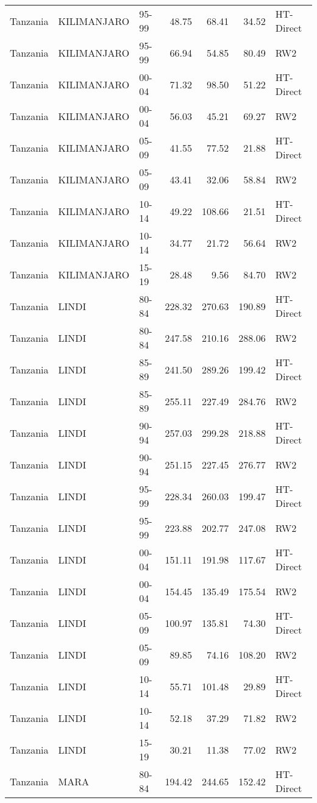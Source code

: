 \begin{longtable}{lllrrrl}
  Tanzania & KILIMANJARO & 95-99 & 48.75 & 68.41 & 34.52 & HT-Direct \\ 
  Tanzania & KILIMANJARO & 95-99 & 66.94 & 54.85 & 80.49 & RW2 \\ 
  Tanzania & KILIMANJARO & 00-04 & 71.32 & 98.50 & 51.22 & HT-Direct \\ 
  Tanzania & KILIMANJARO & 00-04 & 56.03 & 45.21 & 69.27 & RW2 \\ 
  Tanzania & KILIMANJARO & 05-09 & 41.55 & 77.52 & 21.88 & HT-Direct \\ 
  Tanzania & KILIMANJARO & 05-09 & 43.41 & 32.06 & 58.84 & RW2 \\ 
  Tanzania & KILIMANJARO & 10-14 & 49.22 & 108.66 & 21.51 & HT-Direct \\ 
  Tanzania & KILIMANJARO & 10-14 & 34.77 & 21.72 & 56.64 & RW2 \\ 
  Tanzania & KILIMANJARO & 15-19 & 28.48 & 9.56 & 84.70 & RW2 \\ 
  Tanzania & LINDI & 80-84 & 228.32 & 270.63 & 190.89 & HT-Direct \\ 
  Tanzania & LINDI & 80-84 & 247.58 & 210.16 & 288.06 & RW2 \\ 
  Tanzania & LINDI & 85-89 & 241.50 & 289.26 & 199.42 & HT-Direct \\ 
  Tanzania & LINDI & 85-89 & 255.11 & 227.49 & 284.76 & RW2 \\ 
  Tanzania & LINDI & 90-94 & 257.03 & 299.28 & 218.88 & HT-Direct \\ 
  Tanzania & LINDI & 90-94 & 251.15 & 227.45 & 276.77 & RW2 \\ 
  Tanzania & LINDI & 95-99 & 228.34 & 260.03 & 199.47 & HT-Direct \\ 
  Tanzania & LINDI & 95-99 & 223.88 & 202.77 & 247.08 & RW2 \\ 
  Tanzania & LINDI & 00-04 & 151.11 & 191.98 & 117.67 & HT-Direct \\ 
  Tanzania & LINDI & 00-04 & 154.45 & 135.49 & 175.54 & RW2 \\ 
  Tanzania & LINDI & 05-09 & 100.97 & 135.81 & 74.30 & HT-Direct \\ 
  Tanzania & LINDI & 05-09 & 89.85 & 74.16 & 108.20 & RW2 \\ 
  Tanzania & LINDI & 10-14 & 55.71 & 101.48 & 29.89 & HT-Direct \\ 
  Tanzania & LINDI & 10-14 & 52.18 & 37.29 & 71.82 & RW2 \\ 
  Tanzania & LINDI & 15-19 & 30.21 & 11.38 & 77.02 & RW2 \\ 
  Tanzania & MARA & 80-84 & 194.42 & 244.65 & 152.42 & HT-Direct \\ 

\end{longtable}
